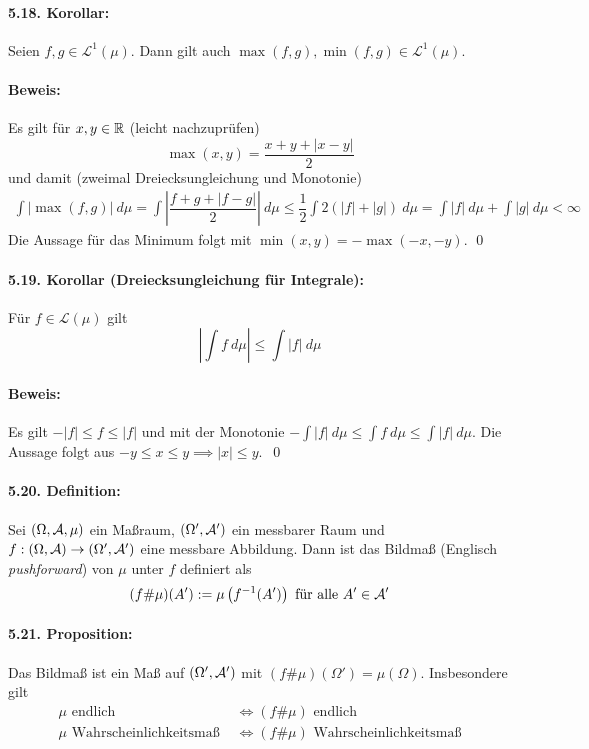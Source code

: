 \paragraph{5.18. Korollar:}Seien $f,g\in\mathcal{L}^1(\mu)$. Dann gilt auch $\max(f,g),\min(f,g)\in\mathcal{L}^1(\mu)$.
  
 \paragraph{Beweis:}Es gilt f\"ur $x,y\in\mathbb{R}$ (leicht nachzupr\"ufen)
 $$\max(x,y)=\dfrac{x+y+|x-y|}{2}$$
 und damit (zweimal Dreiecksungleichung und Monotonie)
 \begin{align*}
     \int |\max(f,g)|\ d\mu=\int \left|\dfrac{f+g+|f-g|}{2}\right|\ d\mu
     \leq\dfrac{1}{2}\int2(|f|+|g|)\ d\mu=\int |f|\ d\mu+\int |g|\ d\mu<\infty 
 \end{align*}
 Die Aussage f\"ur das Minimum folgt mit $\min(x,y)=-\max(-x,-y)$. \qed
 
 \paragraph{5.19. Korollar (Dreiecksungleichung f\"ur Integrale):}F\"ur $f\in\mathcal{L}(\mu)$ gilt
 $$\left|\int f\ d\mu\right|\leq\int |f|\ d\mu$$
 
 \paragraph{Beweis:}Es gilt $-|f|\leq f\leq |f|$ und mit der Monotonie $-\int |f|\ d\mu\leq\int f\ d\mu\leq \int |f|\ d\mu$. Die Aussage folgt aus $-y\leq x\leq y\implies |x|\leq y$. \qed
  
\paragraph{5.20. Definition:}Sei $(\Omega,\mathcal{A},\mu)$ ein Ma\ss{}raum, $(\Omega',\mathcal{A}')$ ein messbarer Raum und $f:(\Omega,\mathcal{A})\to\nobreak(\Omega',\mathcal{A}')$ eine messbare Abbildung. Dann ist das Bildma\ss{} (Englisch \textit{pushforward}) von $\mu$ unter $f$ definiert als
$$(f\#\mu)(A'):=\mu\left(f^{-1}(A')\right)\text{ f\"ur alle }A'\in\mathcal{A}'$$
 
 \paragraph{5.21. Proposition:}Das Bildma\ss{} ist ein Ma\ss{} auf $(\Omega',\mathcal{A}')$ mit $(f\#\mu)(\Omega')=\mu(\Omega)$. Insbesondere gilt
 \begin{align*}
     \mu\text{ endlich }&\iff(f\#\mu)\text{ endlich}\\
     \mu\text{ Wahrscheinlichkeitsma\ss{} }&\iff(f\#\mu)\text{ Wahrscheinlichkeitsma\ss{}}\\
 \end{align*}
 
